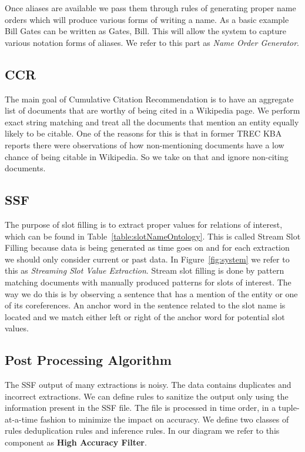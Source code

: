 Once aliases are available we pass them through rules of generating proper name orders which will produce various forms of writing a name. As a basic example Bill Gates can be written as Gates, Bill. This will allow the system to capture various notation forms of aliases. We refer to this part as \textit{Name Order Generator}.

\subsection{CCR}
\label{sec:ccr1}

The main goal of Cumulative Citation Recommendation is to have an aggregate list of documents that are worthy of being cited in a Wikipedia page. We perform exact string matching 
and treat all the documents that mention an entity equally likely to be citable. One of the reasons for this is 
that in former TREC KBA reports \cite{JFrank12} there were observations of how 
non-mentioning documents have a low chance of being citable in Wikipedia.
So we take on that and ignore non-citing documents. 






\subsection{SSF}
\label{sec:ssf1}
The purpose of slot filling is to extract proper values for relations of
interest, which can be found in Table~\ref{table:slotNameOntology}.
This is called Stream Slot Filling because data is being generated as time goes
on and for each extraction we should only consider current or past data.
In Figure~\ref{fig:system} we refer to this as \textit{Streaming Slot Value Extraction}.
Stream slot filling is done by pattern matching documents with manually 
produced patterns for slots of interest. The way we do this is by observing a 
sentence that has a mention of the entity or one of its coreferences. An 
anchor word in the sentence related to the slot name is located and we match 
either left or right of the anchor word for potential slot values. 

\subsection{Post Processing Algorithm}
\label{sec:postproc}

The SSF output of many extractions is noisy. The data contains duplicates and 
incorrect extractions. We can define rules to sanitize the output only using 
the information present in the SSF file. The file is processed in time order, 
in a tuple-at-a-time fashion to minimize the impact on accuracy. We define 
two classes of rules deduplication rules and inference rules. In our diagram we refer to this component as \textbf{High Accuracy Filter}.
